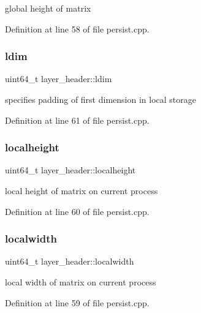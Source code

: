 global height of matrix 

Definition at line 58 of file persist.\+cpp.

\mbox{\label{structlayer__header_a5b4ee2de6371d894b5646b74ceb5c321}} 
\subsubsection{\texorpdfstring{ldim}{ldim}}
{\footnotesize\ttfamily uint64\+\_\+t layer\+\_\+header\+::ldim}

specifies padding of first dimension in local storage 

Definition at line 61 of file persist.\+cpp.

\mbox{\label{structlayer__header_a9ba1c0891787cf3b01611ef27e575a8b}} 
\subsubsection{\texorpdfstring{localheight}{localheight}}
{\footnotesize\ttfamily uint64\+\_\+t layer\+\_\+header\+::localheight}

local height of matrix on current process 

Definition at line 60 of file persist.\+cpp.

\mbox{\label{structlayer__header_abb4a41358a68da8466879972fbcd034d}} 
\subsubsection{\texorpdfstring{localwidth}{localwidth}}
{\footnotesize\ttfamily uint64\+\_\+t layer\+\_\+header\+::localwidth}

local width of matrix on current process 

Definition at line 59 of file persist.\+cpp.

\mbox{\label{structlayer__header_a325142c0466170c6627710106275c7fd}} 
